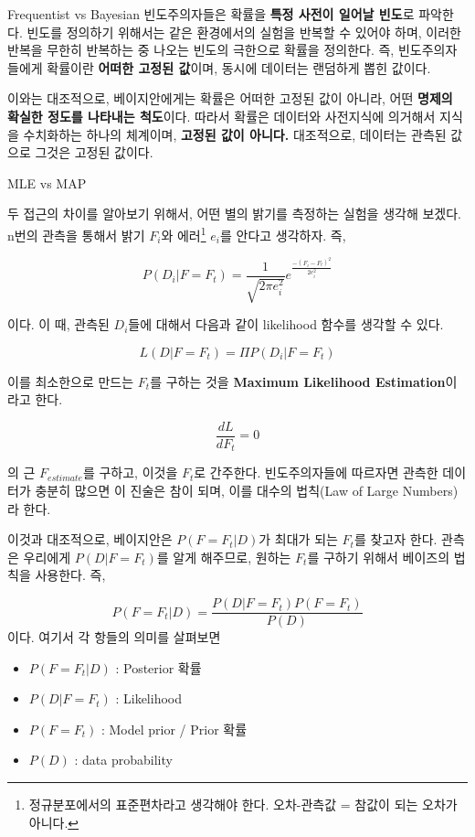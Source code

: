 \documentclass{beamer}
\begin{document}
\begin{frame}{Frequentist vs Bayesian} 
빈도주의자들은 확률을 \textbf{특정 사전이 일어날 빈도}로 파악한다. 빈도를 정의하기 위해서는 같은 환경에서의 실험을 반복할 수 있어야 하며, 이러한 반복을 무한히 반복하는 중 나오는 빈도의 극한으로 확률을 정의한다. 즉, 빈도주의자들에게 확률이란 \textbf{어떠한 고정된 값}이며, 동시에 데이터는 랜덤하게 뽑힌 값이다. 

이와는 대조적으로, 베이지안에게는 확률은 어떠한 고정된 값이 아니라, 어떤 \textbf{명제의 확실한 정도를 나타내는 척도}이다. 따라서 확률은 데이터와 사전지식에 의거해서 지식을 수치화하는 하나의 체계이며, \textbf{고정된 값이 아니다.} 대조적으로, 데이터는 관측된 값으로 그것은 고정된 값이다. 
\end{frame}

\begin{frame}[allowframebreaks]{MLE vs MAP}

두 접근의 차이를 알아보기 위해서, 어떤 별의 밝기를 측정하는 실험을 생각해 보겠다. n번의 관측을 통해서 밝기 $F_i$와 에러\footnote{정규분포에서의 표준편차라고 생각해야 한다. 오차-관측값 = 참값이 되는 오차가 아니다. } $e_i$를 안다고 생각하자. 즉, 

\begin{equation}
P(D_i|F = F_t) = \frac{1}{\sqrt{2 \pi e_i^2}}e^{\frac{-(F_i - F_t)^2}{2e_i^2}}
\end{equation}

이다. 이 때, 관측된 $D_i$들에 대해서 다음과 같이 likelihood 함수를 생각할 수 있다. 

\begin{equation} 
L(D|F = F_t) = \Pi P(D_i|F = F_t)
\end{equation} 

이를 최소한으로 만드는 $F_t$를 구하는 것을 \textbf{Maximum Likelihood Estimation}이라고 한다. 

\begin{equation} 
\frac{dL}{dF_t} = 0
\end{equation}

의 근 $F_{estimate}$를 구하고, 이것을 $F_t$로 간주한다. 빈도주의자들에 따르자면 관측한 데이터가 충분히 많으면 이 진술은 참이 되며, 이를 대수의 법칙(Law of Large Numbers)라 한다. 

이것과 대조적으로, 베이지안은 $P(F=F_t|D)$가 최대가 되는 $F_t$를 찾고자 한다. 관측은 우리에게 $P(D|F=F_t)$를 알게 해주므로, 원하는 $F_t$를 구하기 위해서 베이즈의 법칙을 사용한다. 즉, 

\begin{equation} 
P(F = F_t | D) = \frac{P(D|F=F_t)P(F=F_t)}{P(D)}
\end{equation}
이다. 여기서 각 항들의 의미를 살펴보면 

\begin{itemize} 
\item $P(F = F_t | D)$ : Posterior 확률
\item $P( D | F = F_t )$ : Likelihood 
\item $P(F = F_t )$ : Model prior / Prior 확률
\item $P(D)$ : data probability 
\end{itemize} 



\end{frame}
\end{document}
